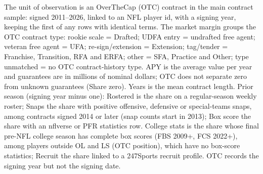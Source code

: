 \begin{table}[!h]
{\begin{threeparttable}
\begin{tablenotes}[para]
\item The unit of observation is an OverTheCap (OTC) contract in the main contract sample: signed 2011--2026, linked to an NFL player id, with a signing year, keeping the first of any rows with identical terms. The market margin groups the OTC contract type: rookie scale = Drafted; UDFA entry = undrafted free agent; veteran free agent = UFA; re-sign/extension = Extension; tag/tender = Franchise, Transition, RFA and ERFA; other = SFA, Practice and Other; type unmatched = no OTC contract-history type. APY is the average value per year and guarantees are in millions of nominal dollars; OTC does not separate zero from unknown guarantees (Share zero). Years is the mean contract length. Prior season (signing year minus one): Rostered is the share on a regular-season weekly roster; Snaps the share with positive offensive, defensive or special-teams snaps, among contracts signed 2014 or later (snap counts start in 2013); Box score the share with an nflverse or PFR statistics row. College stats is the share whose final pre-NFL college season has complete box scores (FBS 2009+, FCS 2022+), among players outside OL and LS (OTC position), which have no box-score statistics; Recruit the share linked to a 247Sports recruit profile. OTC records the signing year but not the signing date.
\end{tablenotes}
\end{threeparttable}}
\end{table}
